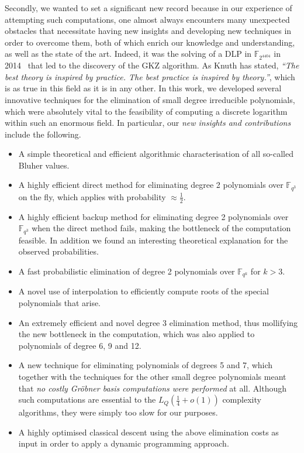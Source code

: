 \documentclass[11pt]{llncs}
\newcommand{\F}{\mathbb F}
\begin{document}
Secondly, we wanted to set a significant new record because in our experience of attempting such computations, one almost always encounters many 
unexpected obstacles that necessitate having new insights and developing new techniques in order to overcome them, both of which enrich our knowledge 
and understanding, as well as the state of the art. 
Indeed, it was the solving of a DLP in $\F_{2^{4404}}$ in 2014~\cite{GKZ14a} that led to the discovery of the 
GKZ algorithm. As Knuth has stated, \emph{``The best theory is inspired by practice. The best practice is inspired by theory.''}, which is 
as true in this field as it is in any other. 
In this work, we developed several innovative techniques for the elimination of small degree irreducible polynomials, 
which were absolutely vital to the feasibility of computing a discrete logarithm within such an enormous field. 
In particular, our \emph{new insights and contributions} include the following.
\begin{itemize}
\item A simple theoretical and efficient algorithmic characterisation of all so-called Bluher values.
\item A highly efficient direct method for eliminating degree 2 polynomials over $\F_{q^3}$ on the fly, which applies with probability $\approx \frac{1}{2}$.
\item A highly efficient backup method for eliminating degree 2 polynomials over $\F_{q^3}$ when the direct method fails, making the bottleneck of the computation feasible. In addition we found an interesting theoretical explanation for the observed probabilities.
\item A fast probabilistic elimination of degree 2 polynomials over $\F_{q^k}$ for $k > 3$.
\item A novel use of interpolation to efficiently compute roots of the special polynomials that arise.  
\item An extremely efficient and novel degree 3 elimination method, thus mollifying the new bottleneck in the computation, which was also applied to polynomials of degree 6, 9 and 12.
\item A new technique for eliminating polynomials of degrees 5 and 7, which together with the techniques for the other small degree polynomials meant that \emph{no costly Gr\"obner basis computations were performed} at all. Although such computations are essential to the $L_Q(\frac 1 4 + o(1))$ complexity algorithms, they were simply too slow for our purposes.
\item A highly optimised classical descent using the above elimination costs as input in order to apply a dynamic programming approach.
\end{itemize}
\end{document}
